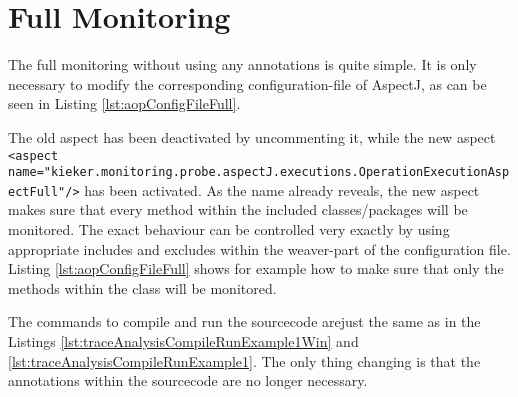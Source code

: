 \section{Full Monitoring}\label{sec:aspectJ:fullweaving}
The full monitoring without using any annotations is quite simple. It is only necessary to modify the corresponding configuration-file of AspectJ, as can be seen in Listing \ref{lst:aopConfigFileFull}.
\setXMLListing

The old aspect has been deactivated by uncommenting it, while the new aspect \lstinline$<aspect name="kieker.monitoring.probe.aspectJ.executions.OperationExecutionAspectFull"/>$ has been activated. As the name already reveals, the new aspect makes sure that every method within the included classes/packages will be monitored. The exact behaviour can be controlled very exactly by using appropriate includes and excludes within the weaver-part of the configuration file. Listing \ref{lst:aopConfigFileFull} shows for example how to make sure that only the methods within the class  will be monitored.

The commands to compile and run the sourcecode arejust the same as in the Listings \ref{lst:traceAnalysisCompileRunExample1Win} and \ref{lst:traceAnalysisCompileRunExample1}. The only thing changing is that the annotations within the sourcecode are no longer necessary.